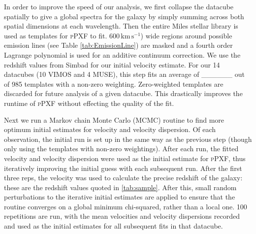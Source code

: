 		In order to improve the speed of our analysis, we first collapse the datacube spatially to give a global spectra for the galaxy by simply summing across both spatial dimensions at each wavelength. Then the entire Miles stellar library \citep{Sanchez-Blazquez2006, Falcon-Barroso2011a} is used as templates for \textsc{pPXF} to fit. $600\,\mathrm{km\,s^{-1}}$) wide regions around possible emission lines (see Table \ref{tab:EmissionLine}) are masked and a fourth order Lagrange polynomial is used for an additive continuum correction. We use the redshift values from Simbad \citep{Wenger2000} for our initial velocity estimate. For our 14 datacubes (10 VIMOS and 4 MUSE), this step fits an average of \_\_\_\_\_\_ out of 985 templates with a non-zero weighting. Zero-weighted templates are discarded for future analysis of a given datacube. This drastically improves the runtime of \textsc{pPXF} without effecting the quality of the fit.





		Next we run a Markov chain Monte Carlo (MCMC) routine to find more optimum initial estimates for velocity and velocity dispersion. Of each observation, the initial run is set up in the same way as the previous step (though only using the templates with non-zero weightings). After each run, the fitted velocity and velocity dispersion were used as the initial estimate for \textsc{pPXF}, thus iteratively improving the initial guess with each subsequent run. After the first three reps, the velocity was used to calculate the precise redshift of the galaxy: these are the redshift values quoted in \ref{tab:sample}. After this, small random perturbations to the iterative initial estimates are applied to ensure that the routine converges on a global minimum chi-squared, rather than a local one. 100 repetitions are run, with the mean velocities and velocity dispersions recorded and used as the initial estimates for all subsequent fits in that datacube. 

